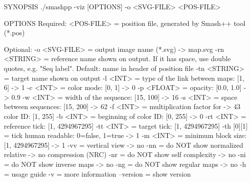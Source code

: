 \begin{code}[style=bash]
SYNOPSIS
  ./smashpp -viz [OPTIONS]  -o <SVG-FILE>  <POS-FILE>

OPTIONS
  Required:
  <POS-FILE>         = position file, generated by
                       Smash++ tool (*.pos)

  Optional:
  -o  <SVG-FILE>     = output image name (*.svg)             -> map.svg
  -rn <STRING>       = reference name shown on output. If it
                       has space, use double quotes, e.g.
                       "Seq label". Default: name in header
                       of position file
  -tn <STRING>       = target name shown on output
  -l  <INT>          = type of the link between maps: [1, 6] -> 1
  -c  <INT>          = color mode: [0, 1]                    -> 0
  -p  <FLOAT>        = opacity: [0.0, 1.0]                   -> 0.9
  -w  <INT>          = width of the sequence: [15, 100]      -> 16
  -s  <INT>          = space between sequences: [15, 200]    -> 62
  -f  <INT>          = multiplication factor for             -> 43
                       color ID: [1, 255]
  -b  <INT>          = beginning of color ID: [0, 255]       -> 0
  -rt <INT>          = reference tick: [1, 4294967295]
  -tt <INT>          = target tick: [1, 4294967295]
  -th [0][1]         = tick human readable: 0=false, 1=true  -> 1
  -m  <INT>          = minimum block size: [1, 4294967295]   -> 1
  -vv                = vertical view                         -> no
  -nn                = do NOT show normalized relative       -> no
                       compression (NRC)
  -nr                = do NOT show self complexity           -> no
  -ni                = do NOT show inverse maps              -> no
  -ng                = do NOT show regular maps              -> no
  -h                 = usage guide
  -v                 = more information
  --version          = show version
\end{code}

